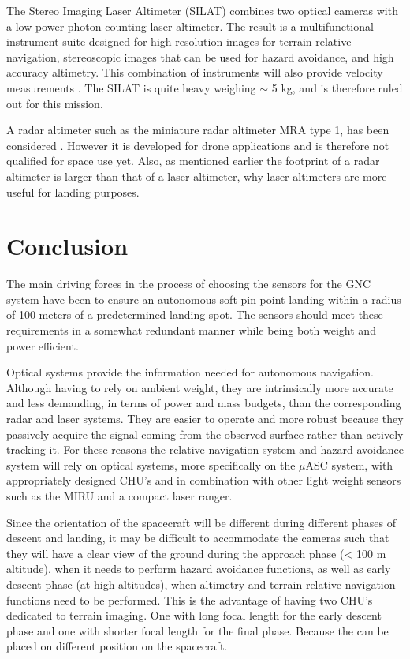 The Stereo Imaging Laser Altimeter (SILAT) combines two optical cameras with a low-power photon-counting laser altimeter. The result is a multifunctional instrument suite designed for high resolution images for terrain relative navigation, stereoscopic images that can be used for hazard avoidance, and high accuracy altimetry. This combination of instruments will also provide velocity measurements \citep{SILAT}. The SILAT is quite heavy weighing $\sim$ 5 kg, and is therefore ruled out for this mission.

A radar altimeter such as the miniature radar altimeter MRA type 1, has been considered \cite{http://www.miniradalt.com/mra-type-1.html}. However it is developed for drone applications and is therefore not qualified for space use yet. Also, as mentioned earlier the footprint of a radar altimeter is larger than that of a laser altimeter, why laser altimeters are more useful for landing purposes.  



\section{Conclusion}

The main driving forces in the process of choosing the sensors for the GNC system have been to ensure an autonomous soft pin-point landing within a radius of 100 meters of a predetermined landing spot. The sensors should meet these requirements in a somewhat redundant manner while being both weight and power efficient. 

Optical systems provide the information needed for autonomous navigation. Although having to rely on ambient weight, they are intrinsically more accurate and less demanding, in terms of power and mass budgets, than the corresponding radar and laser systems. They are easier to operate and more robust because they passively acquire the signal coming from the observed surface rather than actively tracking it. For these reasons the relative navigation system and hazard avoidance system will rely on optical systems, more specifically on the $\mu$ASC system, with appropriately designed CHU's and in combination with other light weight sensors such as the MIRU and a compact laser ranger.

Since the orientation of the spacecraft will be different during different phases of descent and landing, it may be difficult to accommodate the cameras such that they will have a clear view of the ground during the approach phase (< 100 m altitude), when it needs to perform hazard avoidance functions, as well as early descent phase (at high altitudes), when altimetry and terrain relative navigation functions need to be performed. This is the advantage of having two CHU's dedicated to terrain imaging. One with long focal length for the early descent phase and one with shorter focal length for the final phase. Because the can be placed on different position on the spacecraft.


